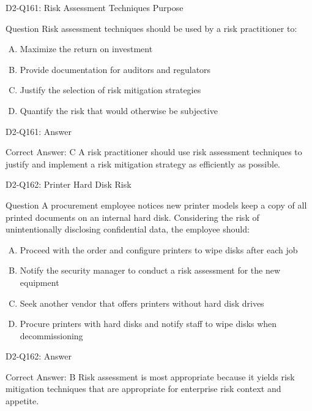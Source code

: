 \documentclass{beamer}
\begin{document}
	\begin{frame}{D2-Q161: Risk Assessment Techniques Purpose}
		\begin{block}{Question}
			Risk assessment techniques should be used by a risk practitioner to:
		\end{block}
		\begin{enumerate}[(A)]
			\item Maximize the return on investment
			\item Provide documentation for auditors and regulators
			\item Justify the selection of risk mitigation strategies
			\item Quantify the risk that would otherwise be subjective
		\end{enumerate}
	\end{frame}
	\begin{frame}{D2-Q161: Answer}
		\begin{block}{Correct Answer: C}
			A risk practitioner should use risk assessment techniques to justify and implement a risk mitigation strategy as efficiently as possible.
		\end{block}
	\end{frame}
	
	\begin{frame}{D2-Q162: Printer Hard Disk Risk}
		\begin{block}{Question}
			A procurement employee notices new printer models keep a copy of all printed documents on an internal hard disk. Considering the risk of unintentionally disclosing confidential data, the employee should:
		\end{block}
		\begin{enumerate}[(A)]
			\item Proceed with the order and configure printers to wipe disks after each job
			\item Notify the security manager to conduct a risk assessment for the new equipment
			\item Seek another vendor that offers printers without hard disk drives
			\item Procure printers with hard disks and notify staff to wipe disks when decommissioning
		\end{enumerate}
	\end{frame}
	\begin{frame}{D2-Q162: Answer}
		\begin{block}{Correct Answer: B}
			Risk assessment is most appropriate because it yields risk mitigation techniques that are appropriate for enterprise risk context and appetite.
		\end{block}
	\end{frame}
	
\end{document}
